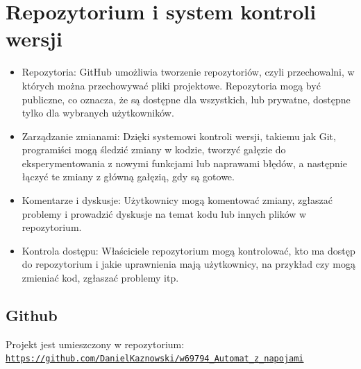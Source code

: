 \section{Repozytorium i system kontroli wersji}

\begin{itemize}
    \item Repozytoria: GitHub umożliwia tworzenie repozytoriów, czyli przechowalni, w których można przechowywać pliki projektowe. Repozytoria mogą być publiczne, co oznacza, że są dostępne dla wszystkich, lub prywatne, dostępne tylko dla wybranych użytkowników.
    \item Zarządzanie zmianami: Dzięki systemowi kontroli wersji, takiemu jak Git, programiści mogą śledzić zmiany w kodzie, tworzyć gałęzie do eksperymentowania z nowymi funkcjami lub naprawami błędów, a następnie łączyć te zmiany z główną gałęzią, gdy są gotowe.
    \item Komentarze i dyskusje: Użytkownicy mogą komentować zmiany, zgłaszać problemy i prowadzić dyskusje na temat kodu lub innych plików w repozytorium.
    \item Kontrola dostępu: Właściciele repozytorium mogą kontrolować, kto ma dostęp do repozytorium i jakie uprawnienia mają użytkownicy, na przykład czy mogą zmieniać kod, zgłaszać problemy itp.
\end{itemize}
\subsection*{Github}
Projekt jest umieszczony w repozytorium: 
\newline
\href{https://github.com/DanielKaznowski/w69794_Automat_z_napojami}{\texttt{https://github.com/DanielKaznowski/w69794_Automat_z_napojami}}




